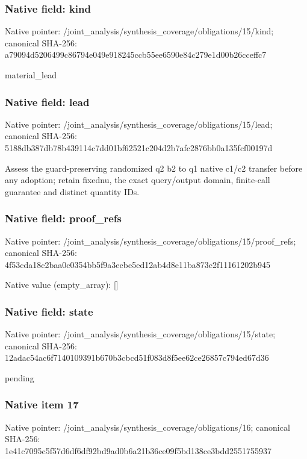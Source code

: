 \documentclass[10pt,a4paper]{article}
\begin{document}
\subsubsection{Native field: kind}
Native pointer: /joint\_\allowbreak{}analysis/synthesis\_\allowbreak{}coverage/obligations/15/kind; canonical SHA-256: a79094d5206499c86794e049e918245ccb55ee6590e84c279e1d00b26cceffc7

\begingroup\raggedright\sloppy material\_\allowbreak{}lead\par\endgroup

\subsubsection{Native field: lead}
Native pointer: /joint\_\allowbreak{}analysis/synthesis\_\allowbreak{}coverage/obligations/15/lead; canonical SHA-256: 5188db387db78b439114c7dd01bf62521c204d2b7afc2876bb0a135fcf00197d

\begingroup\raggedright\sloppy Assess the guard-preserving randomized q2 b2 to q1 native c1/\allowbreak{}c2 transfer before any adoption;\allowbreak{} retain fixednu,\allowbreak{} the exact query/\allowbreak{}output domain,\allowbreak{} finite-call guarantee and distinct quantity IDs.\par\endgroup

\subsubsection{Native field: proof\_\allowbreak{}refs}
Native pointer: /joint\_\allowbreak{}analysis/synthesis\_\allowbreak{}coverage/obligations/15/proof\_\allowbreak{}refs; canonical SHA-256: 4f53cda18c2baa0c0354bb5f9a3ecbe5ed12ab4d8e11ba873c2f11161202b945

Native value (empty\_\allowbreak{}array): []

\subsubsection{Native field: state}
Native pointer: /joint\_\allowbreak{}analysis/synthesis\_\allowbreak{}coverage/obligations/15/state; canonical SHA-256: 12adac54ac6f7140109391b670b3cbcd51f083d8f5ee62ce26857c794ed67d36

\begingroup\raggedright\sloppy pending\par\endgroup

\subsubsection{Native item 17}
Native pointer: /joint\_\allowbreak{}analysis/synthesis\_\allowbreak{}coverage/obligations/16; canonical SHA-256: 1e41c7095c5f57d6df6df92bd9ad0b6a21b36ce09f5bd138ce3bdd2551755937
\end{document}
